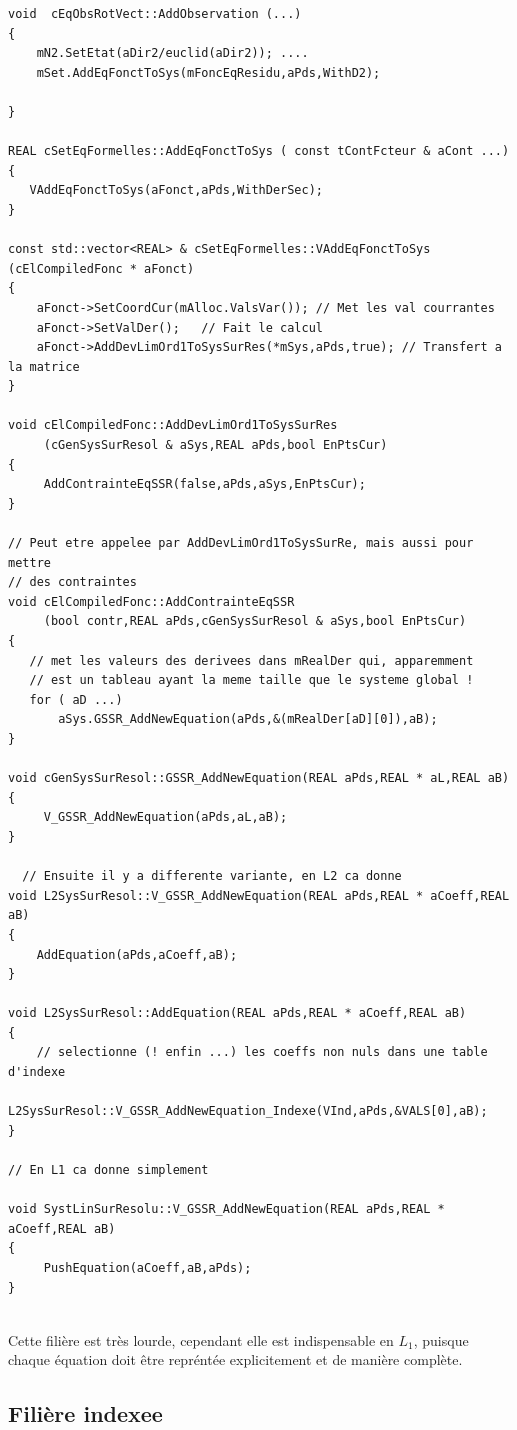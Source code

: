 {\small
\begin{verbatim}
void  cEqObsRotVect::AddObservation (...)
{
    mN2.SetEtat(aDir2/euclid(aDir2)); ....
    mSet.AddEqFonctToSys(mFoncEqResidu,aPds,WithD2);

}

REAL cSetEqFormelles::AddEqFonctToSys ( const tContFcteur & aCont ...)
{
   VAddEqFonctToSys(aFonct,aPds,WithDerSec);
}

const std::vector<REAL> & cSetEqFormelles::VAddEqFonctToSys (cElCompiledFonc * aFonct)
{
    aFonct->SetCoordCur(mAlloc.ValsVar()); // Met les val courrantes
    aFonct->SetValDer();   // Fait le calcul
    aFonct->AddDevLimOrd1ToSysSurRes(*mSys,aPds,true); // Transfert a la matrice
}

void cElCompiledFonc::AddDevLimOrd1ToSysSurRes
     (cGenSysSurResol & aSys,REAL aPds,bool EnPtsCur)
{
     AddContrainteEqSSR(false,aPds,aSys,EnPtsCur);
}

// Peut etre appelee par AddDevLimOrd1ToSysSurRe, mais aussi pour mettre
// des contraintes
void cElCompiledFonc::AddContrainteEqSSR
     (bool contr,REAL aPds,cGenSysSurResol & aSys,bool EnPtsCur)
{
   // met les valeurs des derivees dans mRealDer qui, apparemment
   // est un tableau ayant la meme taille que le systeme global !
   for ( aD ...)
       aSys.GSSR_AddNewEquation(aPds,&(mRealDer[aD][0]),aB);
}

void cGenSysSurResol::GSSR_AddNewEquation(REAL aPds,REAL * aL,REAL aB)
{
     V_GSSR_AddNewEquation(aPds,aL,aB);
}

  // Ensuite il y a differente variante, en L2 ca donne
void L2SysSurResol::V_GSSR_AddNewEquation(REAL aPds,REAL * aCoeff,REAL aB)
{
    AddEquation(aPds,aCoeff,aB);
}

void L2SysSurResol::AddEquation(REAL aPds,REAL * aCoeff,REAL aB)
{
    // selectionne (! enfin ...) les coeffs non nuls dans une table d'indexe
    L2SysSurResol::V_GSSR_AddNewEquation_Indexe(VInd,aPds,&VALS[0],aB);
}

// En L1 ca donne simplement

void SystLinSurResolu::V_GSSR_AddNewEquation(REAL aPds,REAL * aCoeff,REAL aB)
{
     PushEquation(aCoeff,aB,aPds);
}


\end{verbatim}
}


Cette fili\`ere est tr\`es lourde, cependant elle est indispensable en $L_1$, puisque
chaque \'equation doit \^etre repr\'ent\'ee explicitement et de mani\`ere compl\`ete.


\subsection {Fili\`ere indexee}

